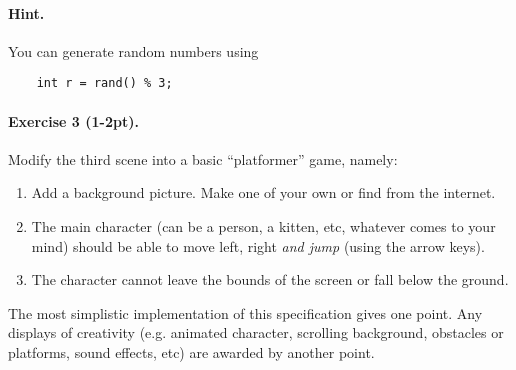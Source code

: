 \documentclass{article}
\newenvironment{exercise}[2]{\paragraph{Exercise #1 (#2pt).} }{}
\begin{document}
\paragraph{Hint.} You can generate random numbers using
\begin{lstlisting}
	int r = rand() % 3;
\end{lstlisting}

\begin{exercise}{3}{1-2}
Modify the third scene into a basic ``platformer'' game, namely:
\begin{enumerate}
\item Add a background picture. Make one of your own or find from the internet.
\item The main character (can be a person, a kitten, etc, whatever comes to your mind) should be able to move left, right \emph{and jump} (using the arrow keys).
\item The character cannot leave the bounds of the screen or fall below the ground.
\end{enumerate}
The most simplistic implementation of this specification gives one point. Any displays of creativity (e.g. animated character, scrolling background, obstacles or platforms, sound effects, etc) are awarded by another point.

\end{exercise}
\end{document}
